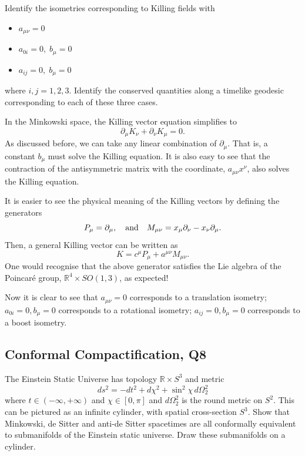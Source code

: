 Identify the isometries corresponding to Killing fields with
\begin{itemize}
    \item $a_{\mu\nu} = 0$
    \item $a_{0i} = 0,\; b_\mu = 0$
    \item $a_{ij} = 0,\; b_\mu = 0$
\end{itemize}
where $i,j=1,2,3$. Identify the conserved quantities along a timelike geodesic corresponding to each of these three cases.
\begin{solution}
    In the Minkowski space, the Killing vector equation simplifies to 
    \begin{equation}
        \partial_\mu K_\nu + \partial_\nu K_\mu = 0.
    \end{equation}
    As discussed before, we can take any linear combination of $\partial_\mu$. That is, a constant $b_\mu$ must solve the Killing equation. It is also easy to see that the contraction of the antisymmetric matrix with the coordinate, $a_{\mu\nu}x^\nu$, also solves the Killing equation.

    It is easier to see the physical meaning of the Killing vectors by defining the generators
    \begin{equation}
        P_\mu = \partial_\mu, \quad {\rm and} \quad M_{\mu\nu} = x_\mu\partial_\nu - x_\nu\partial_\mu.
    \end{equation}
    Then, a general Killing vector can be written as
    \begin{equation}
        K = c^\mu P_\mu + a^{\mu\nu}M_{\mu\nu}.
    \end{equation}
    One would recognise that the above generator satisfies the Lie algebra of the Poincaré group, $\mathbb{R}^4\times SO(1,3)$, as expected!
    
    Now it is clear to see that $a_{\mu\nu}=0$ corresponds to a translation isometry; $a_{0i}=0,b_\mu=0$ corresponds to a rotational isometry; $a_{ij}=0,b_\mu=0$ corresponds to a boost isometry.
\end{solution}

\subsection{Conformal Compactification, Q8}

The Einstein Static Universe has topology $\mathbb{R}\times S^3$ and metric
\begin{equation}
    ds^2 = -dt^2 + d\chi^2 + \sin^2\chi\,d\Omega_2^2
\end{equation}
where $t\in(-\infty,+\infty)$ and $\chi\in[0,\pi]$ and $d\Omega_2^2$ is the round metric on $S^2$. This can be pictured as an infinite cylinder, with spatial cross-section $S^3$. Show that Minkowski, de Sitter and anti-de Sitter spacetimes are all conformally equivalent to submanifolds of the Einstein static universe. Draw these submanifolds on a cylinder.

